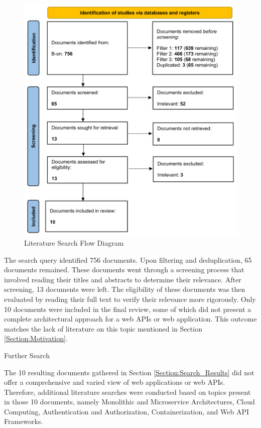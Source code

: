 \documentclass[12pt, reqno]{amsbook}
\makeatletter
\def\section{\@startsection{section}{1}%
      \z@{.5\linespacing\@plus.7\linespacing}{.25\linespacing}%
      {\normalfont\bfseries\flushleft}}
\theoremstyle{definition}
\theoremstyle{definition}
\numberwithin{section}{chapter}
\numberwithin{table}{chapter}
\numberwithin{figure}{chapter}
\makeatother
\begin{document}
\begin{figure}[H]
  \centering
  \includegraphics[width=0.9\linewidth]{images/Literature_Search_Flow_Diagram.png}
  \caption{\label{Figure:Literature_Search_Flow_Diagram}Literature Search Flow Diagram}
\end{figure}

The search query identified 756 documents. Upon filtering and deduplication, 65 documents remained. These documents went through a screening process that involved reading their titles and abstracts to determine their relevance. After screening, 13 documents were left. The eligibility of these documents was then evaluated by reading their full text to verify their relevance more rigorously. Only 10 documents were included in the final review, some of which did not present a complete architectural approach for a web \acp{API} or web application. This outcome matches the lack of literature on this topic mentioned in Section \ref{Section:Motivation}.

\section{Further Search}
\label{Section:Further_Search}

The 10 resulting documents gathered in Section \ref{Section:Search_Results} did not offer a comprehensive and varied view of web applications or web \acp{API}. Therefore, additional literature searches were conducted based on topics present in those 10 documents, namely Monolithic and Microservice Architectures, Cloud Computing, Authentication and Authorization, Containerization, and Web \ac{API} Frameworks.
\end{document}
